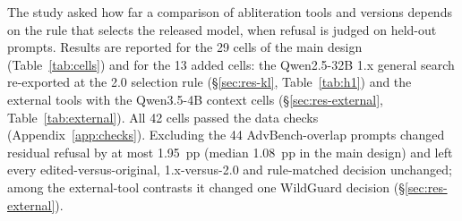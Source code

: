 The study asked how far a comparison of abliteration tools and versions depends on the rule that selects the released
model, when refusal is judged on held-out prompts. Results are reported for the 29 cells of the main design (Table~\ref{tab:cells}) and
for the 13 added cells: the Qwen2.5-32B 1.x general search re-exported at the 2.0 selection rule
(\S\ref{sec:res-kl}, Table~\ref{tab:h1}) and the external tools with the Qwen3.5-4B context cells
(\S\ref{sec:res-external}, Table~\ref{tab:external}). All 42 cells passed the data checks
(Appendix~\ref{app:checks}). Excluding the 44 AdvBench-overlap prompts changed residual refusal by at most 1.95~pp
(median 1.08~pp in the main design) and left every edited-versus-original, 1.x-versus-2.0 and rule-matched decision
unchanged; among the external-tool contrasts it changed one WildGuard decision (\S\ref{sec:res-external}).

